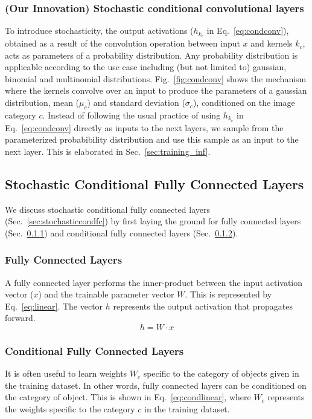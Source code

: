 \documentclass[12pt, letterpaper]{article}
\begin{document}
\subsubsection{(Our Innovation) Stochastic conditional convolutional layers}
\label{sec:stochasticcondconv}
To introduce stochasticity, the output activations ($h_{k_c}$ in Eq.~\eqref{eq:condconv}), obtained as a result of the convolution operation between input $x$ and kernels $k_c$, acts as parameters of a probability distribution. 
Any probability distribution is applicable according to the use case including (but not limited to) gaussian, binomial and multinomial distributions.  
Fig.~\ref{fig:condconv} shows the mechanism where the kernels convolve over an input to produce the parameters of a gaussian distribution, mean ($\mu_c$) and standard deviation ($\sigma_c$), conditioned on the image category $c$. Instead of following the usual practice of using $h_{k_c}$ in Eq.~\eqref{eq:condconv} directly as inputs to the next layers, we sample from the parameterized probabibility distribution and use this sample as an input to the next layer. This is elaborated in Sec.~\ref{sec:training_inf}.

\subsection{Stochastic Conditional Fully Connected Layers}
We discuss stochastic conditional fully connected layers (Sec.~\ref{sec:stochasticcondfc}) by first laying the ground for fully connected layers (Sec.~\ref{sec:fc}) and conditional fully connected layers (Sec.~\ref{sec:condfc}).

\subsubsection{Fully Connected Layers} 
\label{sec:fc}
A fully connected layer performs the inner-product between the input activation vector ($x$) and the trainable parameter vector $W$.
This is represented by Eq.~\eqref{eq:linear}. The vector $h$ represents the output activation that propagates forward.
\begin{equation}
h=W \cdot x
    \label{eq:linear}
\end{equation}

\subsubsection{Conditional Fully Connected Layers}
\label{sec:condfc}
It is often useful to learn weights $W_c$ specific to the category of objects given in the training dataset. In other words, fully connected layers can be conditioned on the category of object. This is shown in Eq.~\eqref{eq:condlinear}, where $W_c$ represents the weights specific to the category $c$ in the training dataset.
\end{document}
